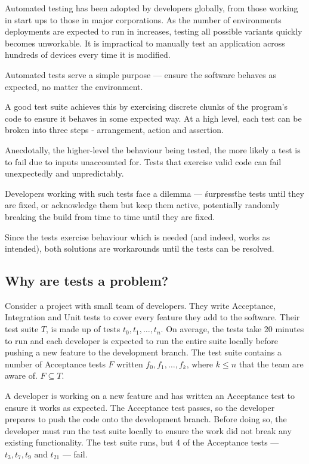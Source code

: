 Automated testing has been adopted by developers globally, from those working in start ups to those in major corporations. As the number of environments deployments are expected to run in increases, testing all possible variants quickly becomes unworkable. It is impractical to manually test an application across hundreds of devices every time it is modified.

Automated tests serve a simple purpose --- ensure the software behaves as expected, no matter the environment.

A good test suite achieves this by exercising discrete chunks of the program's code to ensure it behaves in some expected way. At a high level, each test can be broken into three steps - arrangement, action and assertion.

Anecdotally, the higher-level the behaviour being tested, the more likely a test is to fail due to inputs unaccounted for. Tests that exercise valid code can fail unexpectedly and unpredictably.

Developers working with such tests face a dilemma --- \'surpress\' the tests until they are fixed, or acknowledge them but keep them active, potentially randomly breaking the build from time to time until they are fixed.

Since the tests exercise behaviour which is needed (and indeed, works as intended), both solutions are workarounds until the tests can be resolved.

\subsection{Why are \flaky tests a problem?}

Consider a project with small team of developers. They write Acceptance, Integration and Unit tests to cover every feature they add to the software. Their test suite $T$, is made up of tests $t_{0}, t_{1}, \dots, t_{n}$. On average, the tests take 20 minutes to run and each developer is expected to run the entire suite locally before pushing a new feature to the development branch. The test suite contains a number of \flaky Acceptance tests $F$ written $f_{0}, f_{1}, \dots, f_{k} \text{, where $k \leq n$}$ that the team are aware of. $F \subseteq T$.

A developer is working on a new feature and has written an Acceptance test to ensure it works as expected. The Acceptance test passes, so the developer prepares to push the code onto the development branch. Before doing so, the developer must run the test suite locally to ensure the work did not break any existing functionality. The test suite runs, but 4 of the Acceptance tests --- $t_{3}, t_{7}, t_{9} \text{ and } t_{21}$ --- fail.

